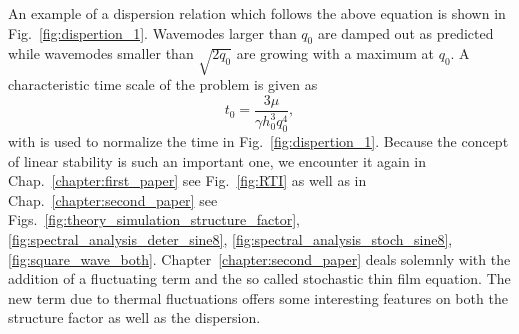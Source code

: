 An example of a dispersion relation which follows the above equation is shown in Fig.~\ref{fig:dispertion_1}.
Wavemodes larger than $q_0$ are damped out as predicted while wavemodes smaller than $\sqrt{2q_0}$ are growing with a maximum at $q_0$.
A characteristic time scale of the problem is given as
\begin{equation}
    t_0 = \frac{3\mu}{\gamma h_0^3 q_0^4},
\end{equation}
with is used to normalize the time in Fig.~\ref{fig:dispertion_1}.
Because the concept of linear stability is such an important one, we encounter it again in Chap.~\ref{chapter:first_paper} see Fig.~\ref{fig:RTI} as well as in Chap.~\ref{chapter:second_paper} see Figs.~\ref{fig:theory_simulation_structure_factor}, \ref{fig:spectral_analysis_deter_sine8}, \ref{fig:spectral_analysis_stoch_sine8}, \ref{fig:square_wave_both}.
Chapter~\ref{chapter:second_paper} deals solemnly with the addition of a fluctuating term and the so called stochastic thin film equation.
The new term due to thermal fluctuations offers some interesting features on both the structure factor as well as the dispersion.

